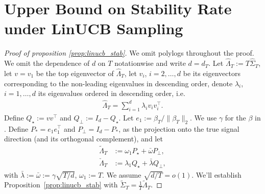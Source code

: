 \documentclass[11pt]{article}
\begin{document}
\section{Upper Bound on Stability Rate under LinUCB Sampling}
\label{appendix:stability_rate}

\begin{proof}[Proof of proposition \ref{prop:linucb_stab}]
We omit polylogs throughout the proof. We omit the dependence of $d$ on $T$ notationwise and write $d = d_T$. Let $\widehat \Lambda_T := T \widehat \Sigma_T$, let $v = v_1$ be the top eigenvector of $\widehat \Lambda_T$, let $v_i$, $i=2,\ldots,d$ be its eigenvectors corresponding to the non-leading eigenvalues in descending order, denote $\lambda_i$, $i=1,\ldots,d$ its eigenvalues ordered in descending order, i.e.
\begin{align*}
    \widehat\Lambda_T = \sum_{i=1}^{d}\lambda_i v_iv_i^{\top}.
\end{align*}
Define $Q_\star := vv^\top$ and $Q_{\perp} := I_d - Q_\star$. Let $e_1 := \beta_T / \| \beta_T \|_2$. We use $\gamma$ for the $\beta$ in \citet{fan2025statisticalinferenceadaptivesampling}. Define $P_{\ast} = e_1e_1^{\top}$ and $P_{\perp} = I_d - P_{\ast}$, as the projection onto the true signal direction (and its orthogonal complement), and let 
    \begin{align}
        \widetilde \Lambda_T &:= \omega_1 P_\star + \bar \omega P_{\perp},\\
        \check \Lambda_T &:= \lambda_1 Q_\star + \bar \lambda Q_\perp,
    \end{align}
with $\bar \lambda := \bar \omega := \gamma \sqrt{T / d}$, $\omega_1 := T$. We assume $\sqrt{d / T} = o(1)$. We'll establish Proposition~\ref{prop:linucb_stab} with $\widetilde \Sigma_T = \frac{1}{T}\widetilde \Lambda_T$. 


\end{proof}
\end{document}
